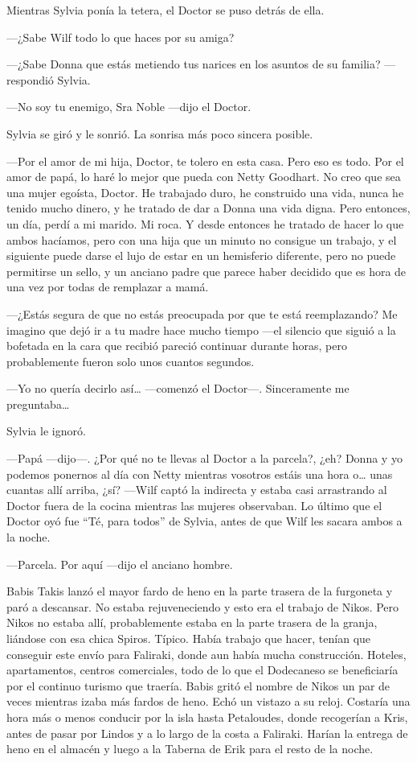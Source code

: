 Mientras Sylvia ponía la tetera, el Doctor se puso detrás de ella.

---¿Sabe Wilf todo lo que haces por su amiga?

---¿Sabe Donna que estás metiendo tus narices en los asuntos de su
familia? ---respondió Sylvia.

---No soy tu enemigo, Sra Noble ---dijo el Doctor.

Sylvia se giró y le sonrió. La sonrisa más poco sincera posible.

---Por el amor de mi hija, Doctor, te tolero en esta casa. Pero eso es
todo. Por el amor de papá, lo haré lo mejor que pueda con Netty
Goodhart. No creo que sea una mujer egoísta, Doctor. He trabajado duro,
he construido una vida, nunca he tenido mucho dinero, y he tratado de
dar a Donna una vida digna. Pero entonces, un día, perdí a mi marido. Mi
roca. Y desde entonces he tratado de hacer lo que ambos hacíamos, pero
con una hija que un minuto no consigue un trabajo, y el siguiente puede
darse el lujo de estar en un hemisferio diferente, pero no puede
permitirse un sello, y un anciano padre que parece haber decidido que es
hora de una vez por todas de remplazar a mamá.

---¿Estás segura de que no estás preocupada por que te está
reemplazando? Me imagino que dejó ir a tu madre hace mucho tiempo ---el
silencio que siguió a la bofetada en la cara que recibió pareció
continuar durante horas, pero probablemente fueron solo unos cuantos
segundos.

---Yo no quería decirlo así\ldots{} ---comenzó el Doctor---.
Sinceramente me preguntaba\ldots{}

Sylvia le ignoró.

---Papá ---dijo---. ¿Por qué no te llevas al Doctor a la parcela?, ¿eh?
Donna y yo podemos ponernos al día con Netty mientras vosotros estáis
una hora o\ldots{} unas cuantas allí arriba, ¿sí? ---Wilf captó la
indirecta y estaba casi arrastrando al Doctor fuera de la cocina
mientras las mujeres observaban. Lo último que el Doctor oyó fue ``Té,
para todos'' de Sylvia, antes de que Wilf les sacara ambos a la noche.

---Parcela. Por aquí ---dijo el anciano hombre.

Babis Takis lanzó el mayor fardo de heno en la parte trasera de la
furgoneta y paró a descansar. No estaba rejuveneciendo y esto era el
trabajo de Nikos. Pero Nikos no estaba allí, probablemente estaba en la
parte trasera de la granja, liándose con esa chica Spiros. Típico. Había
trabajo que hacer, tenían que conseguir este envío para Faliraki, donde
aun había mucha construcción. Hoteles, apartamentos, centros
comerciales, todo de lo que el Dodecaneso se beneficiaría por el
continuo turismo que traería. Babis gritó el nombre de Nikos un par de
veces mientras izaba más fardos de heno. Echó un vistazo a su reloj.
Costaría una hora más o menos conducir por la isla hasta Petaloudes,
donde recogerían a Kris, antes de pasar por Lindos y a lo largo de la
costa a Faliraki. Harían la entrega de heno en el almacén y luego a la
Taberna de Erik para el resto de la noche.

